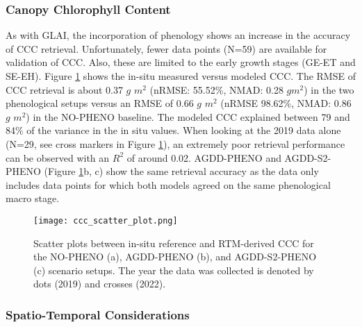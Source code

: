 \subsubsection{Canopy Chlorophyll Content}

As with GLAI, the incorporation of phenology shows an increase in the accuracy of \gls{CCC} retrieval. Unfortunately, fewer data points (N=59) are available for validation of CCC. Also, these are limited to the early growth stages (GE-ET and SE-EH). Figure \ref{fig:ccc-val-scatter} shows the in-situ measured versus modeled CCC. The RMSE of \gls{CCC} retrieval is about 0.37 $g$ $m^2$ (nRMSE: 55.52\%, NMAD: 0.28 $gm^2$) in the two phenological setups versus an RMSE of 0.66 $g$ $m^2$ (nRMSE 98.62\%, NMAD: 0.86 $g$ $m^2$) in the NO-PHENO baseline. The modeled \gls{CCC} explained between 79 and 84\% of the variance in the in situ values. When looking at the 2019 data alone (N=29, see cross markers in Figure \ref{fig:ccc-val-scatter}), an extremely poor retrieval performance can be observed with an $R^2$ of around 0.02. AGDD-PHENO and AGDD-S2-PHENO (Figure \ref{fig:ccc-val-scatter}b, c) show the same retrieval accuracy as the data only includes data points for which both models agreed on the same phenological macro stage.

\begin{figure}[H]
    \centering
    \texttt{[image: ccc\_scatter\_plot.png]}
    \caption[Scatter plots between in-situ reference and RTM-derived \gls{CCC} for the NO-PHENO (a), AGDD-PHENO (b), and AGDD-S2-PHENO (c) scenario setups. The year the data was collected is denoted by dots (2019) and crosses (2022).]{Scatter plots between in-situ reference and RTM-derived \gls{CCC} for the NO-PHENO (a), AGDD-PHENO (b), and AGDD-S2-PHENO (c) scenario setups. The year the data was collected is denoted by dots (2019) and crosses (2022).}
    \label{fig:ccc-val-scatter}
\end{figure}


\subsubsection{Spatio-Temporal Considerations}

